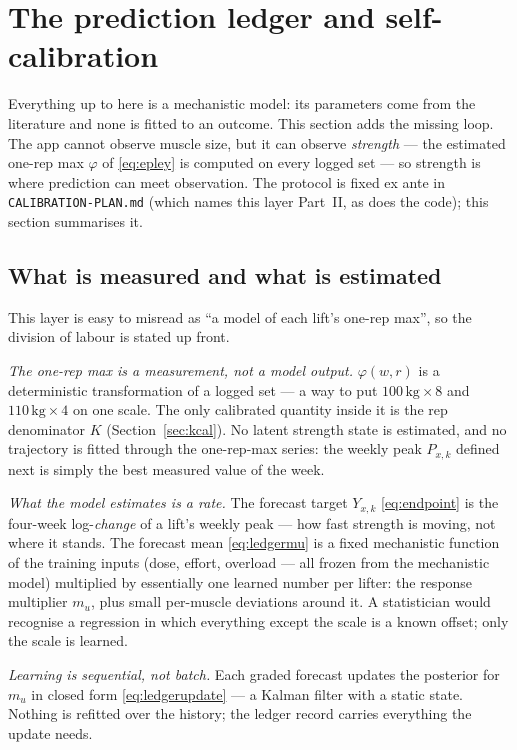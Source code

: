 \documentclass[11pt,a4paper]{article}
\begin{document}
\FloatBarrier
\section{The prediction ledger and self-calibration}\label{sec:ledger}
Everything up to here is a mechanistic model: its parameters come from the literature and none is fitted to an outcome. This section adds the missing loop. The app cannot observe muscle size, but it can observe \emph{strength} --- the estimated one-rep max $\varphi$ of \eqref{eq:epley} is computed on every logged set --- so strength is where prediction can meet observation. The protocol is fixed ex ante in \texttt{CALIBRATION-PLAN.md} (which names this layer Part~II, as does the code); this section summarises it.

\subsection{What is measured and what is estimated}\label{sec:whatis}
This layer is easy to misread as ``a model of each lift's one-rep max'', so the division of labour is stated up front.

\emph{The one-rep max is a measurement, not a model output.} $\varphi(w,r)$ is a deterministic transformation of a logged set --- a way to put $100\,\text{kg}\times 8$ and $110\,\text{kg}\times 4$ on one scale. The only calibrated quantity inside it is the rep denominator $K$ (Section~\ref{sec:kcal}). No latent strength state is estimated, and no trajectory is fitted through the one-rep-max series: the weekly peak $P_{x,k}$ defined next is simply the best measured value of the week.

\emph{What the model estimates is a rate.} The forecast target $Y_{x,k}$ \eqref{eq:endpoint} is the four-week log-\emph{change} of a lift's weekly peak --- how fast strength is moving, not where it stands. The forecast mean \eqref{eq:ledgermu} is a fixed mechanistic function of the training inputs (dose, effort, overload --- all frozen from the mechanistic model) multiplied by essentially one learned number per lifter: the response multiplier $m_u$, plus small per-muscle deviations around it. A statistician would recognise a regression in which everything except the scale is a known offset; only the scale is learned.

\emph{Learning is sequential, not batch.} Each graded forecast updates the posterior for $m_u$ in closed form \eqref{eq:ledgerupdate} --- a Kalman filter with a static state. Nothing is refitted over the history; the ledger record carries everything the update needs.
\end{document}
